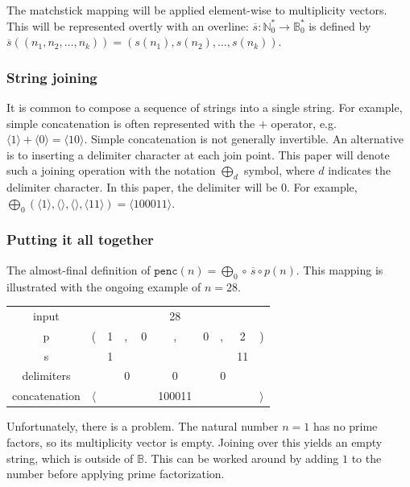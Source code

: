 \documentclass[12pt,reqno]{article}
\begin{document}
The matchstick mapping will be applied element-wise to multiplicity vectors. This will be represented overtly with an overline: $\overline{s} : \mathbb{N}_0^{*} \rightarrow \mathbb{B}_0^{*}$ is defined by $\overline{s}((n_1, n_2, \ldots, n_k)) = (s(n_1), s(n_2), \ldots, s(n_k))$.

\subsubsection{String joining}

It is common to compose a sequence of strings into a single string. For example, simple concatenation is often represented with the $+$ operator, e.g. $\langle 1 \rangle + \langle 0 \rangle = \langle 10 \rangle$. Simple concatenation is not generally invertible. An alternative is to inserting a delimiter character at each join point. This paper will denote such a joining operation with the notation $\bigoplus_d$ symbol, where $d$ indicates the delimiter character. In this paper, the delimiter will be $0$. For example, $\bigoplus_0 (\langle 1 \rangle, \langle \rangle, \langle \rangle, \langle 11 \rangle) = \langle 100011 \rangle$. 

\subsubsection{Putting it all together}

The almost-final definition of $\texttt{penc}(n) = \bigoplus_0 \circ \, \overline{s} \circ p(n)$. This mapping is illustrated with the ongoing example of $n = 28$.
\begin{center} \begin{tabular}{ |c| l cl cc cl c r| } 
  \hline
    input                &                &    &    &     &   28     &     &    &      &  \\
    p                      &       (        & 1 & ,  & 0 & ,           & 0  & ,  &  2  & ) \\
  \hline
    s                      &                 & 1 &    &    &             &     &    & 11  & \\ 
    delimiters        &                 &    & 0 &    &    0       &     & 0 &      & \\
  \hline
    concatenation & $\langle$ &    &     &   & 100011 &    &     &      & $\rangle$ \\
  \hline
\end{tabular} \end{center}
Unfortunately, there is a problem. The natural number $n=1$ has no prime factors, so its multiplicity vector is empty. Joining over this yields an empty string, which is outside of $\mathbb{B}$. This can be worked around by adding $1$ to the number before applying prime factorization.
\end{document}
